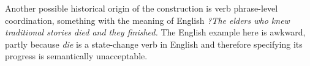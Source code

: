 \documentclass[a4paper, oneside, 12pt]{report}
\newcommand{\form}[1]{\emph{#1}}
\begin{document}
Another possible historical origin of the construction 
is verb phrase-level coordination,  
something with the meaning of 
English \form{?The elders who knew traditional stories died and they finished.}
The English example here is awkward, 
partly because \form{die} is a state-change verb in English 
and therefore specifying its progress is semantically unacceptable.




\end{document}
